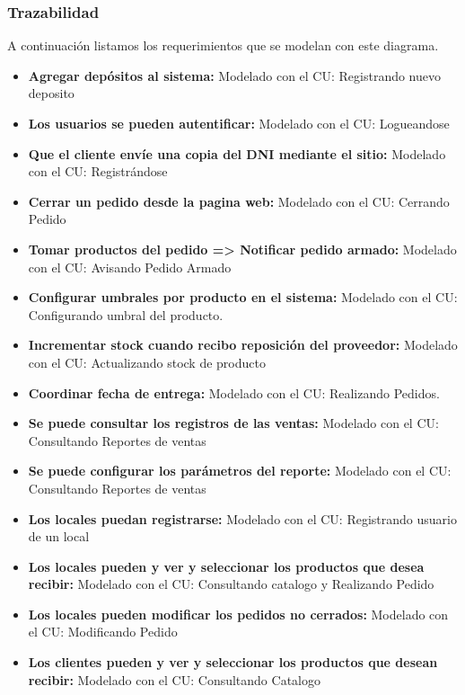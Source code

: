 \subsubsection{Trazabilidad}

A continuación listamos los requerimientos que se modelan con este diagrama.

\begin{itemize}
\item \textbf{Agregar depósitos al sistema:} Modelado con el CU: Registrando nuevo deposito
\item \textbf{Los usuarios se pueden autentificar:} Modelado con el CU: Logueandose
\item \textbf{Que el cliente envíe una copia del DNI mediante el sitio:} Modelado con el CU: Registrándose
\item \textbf{Cerrar un pedido desde la pagina web:} Modelado con el CU: Cerrando Pedido
\item \textbf{Tomar productos del pedido => Notificar pedido armado:} Modelado con el CU: Avisando Pedido Armado
\item \textbf{Configurar umbrales por producto en el sistema:} Modelado con el CU: Configurando umbral del producto.
\item \textbf{Incrementar stock cuando recibo reposición del proveedor:} Modelado con el CU: Actualizando stock de producto
\item \textbf{Coordinar fecha de entrega:} Modelado con el CU: Realizando Pedidos.
\item \textbf{Se puede consultar los registros de las ventas:} Modelado con el CU: Consultando Reportes de ventas
\item \textbf{Se puede configurar los parámetros del reporte:} Modelado con el CU: Consultando Reportes de ventas
\item \textbf{Los locales puedan registrarse:} Modelado con el CU: Registrando usuario de un local
\item \textbf{Los locales pueden y ver y seleccionar los productos que desea recibir:} Modelado con el CU: Consultando catalogo y Realizando Pedido
\item \textbf{Los locales pueden modificar los pedidos no cerrados:} Modelado con el CU: Modificando Pedido
\item \textbf{Los clientes pueden y ver y seleccionar los productos que desean recibir:} Modelado con el CU: Consultando Catalogo


\end{itemize}
